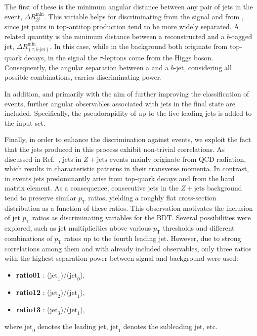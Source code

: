 The first of these is the minimum angular distance between any pair of jets in the event, $\Delta R^{\text{min}}_{jj}$. This variable helps for discriminating \ttbar from the signal and from \ztautau, since jet pairs in top-antitop production tend to be more widely separated. A related quantity is the minimum distance between a reconstructed \tauhad and a $b$-tagged jet, $\Delta R^{\text{min}}_{(\tau,b\text{-jet})}$. In this case, while in the \ttbar background both \tauhad originate from top-quark decays, in the \ttH signal the $\tau$-leptons come from the Higgs boson. Consequently, the angular separation between a \tauhad and a $b$-jet, considering all possible combinations, carries discriminating power. 

In addition, and primarily with the aim of further improving the classification of \ttbar events, further angular observables associated with jets in the final state are included. Specifically, the pseudorapidity of up to the five leading jets is added to the input set.

Finally, in order to enhance the discrimination against \ztautau events, we exploit the fact that the jets produced in this process exhibit non-trivial correlations. As discussed in Ref.~\cite{ztt_jets}, jets in $Z+\text{jets}$ events mainly originate from QCD radiation, which results in characteristic patterns in their transverse momenta. In contrast, in \ttH events jets predominantly arise from top-quark decays and from the hard matrix element. As a consequence, consecutive jets in the $Z+\text{jets}$ background tend to preserve similar $p_{\text{T}}$ ratios, yielding a roughly flat cross-section distribution as a function of these ratios. This observation motivates the inclusion of jet $p_{\text{T}}$ ratios as discriminating variables for the BDT.  
Several possibilities were explored, such as jet multiplicities above various $p_{\text{T}}$ thresholds and different combinations of $p_{\text{T}}$ ratios up to the fourth leading jet. However, due to strong correlations among them and with already included observables, only three ratios with the highest separation power between signal and background were used:
\begin{itemize}
    \small
    \item \textbf{ratio01} : \pt($\text{jet}_1$)/\pt($\text{jet}_0$),
    \item \textbf{ratio12} : \pt($\text{jet}_2$)/\pt($\text{jet}_1$),
    \item \textbf{ratio13} : \pt($\text{jet}_3$)/\pt($\text{jet}_1$),
\end{itemize}
where $\text{jet}_0$ denotes the leading jet, $\text{jet}_1$ denotes the subleading jet, etc.

